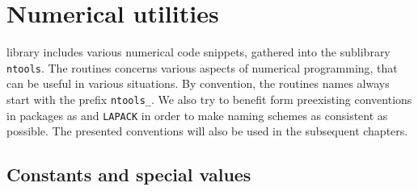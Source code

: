 \chapter{Numerical utilities}

\name{} library includes various numerical code snippets, gathered
into the sublibrary \texttt{ntools}.
The routines concerns various aspects of numerical programming, that
can be useful in various situations.
By convention, the routines names always start with the prefix \verb|ntools_|.
We also try to benefit form preexisting conventions in packages as
\blas{} and \verb|LAPACK| in order to make naming
schemes as consistent as possible.
The presented conventions will also be used in the subsequent chapters.

\section{Constants and special values}


